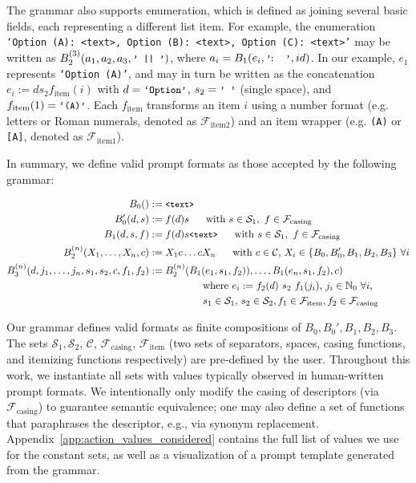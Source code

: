 \documentclass{article} %
\newcommand{\prompt}[1]{{\small{\texttt{#1}}}}
\begin{document}
The grammar also supports enumeration, which is defined as joining several basic fields, each representing a different list item. For example, the enumeration \prompt{`Option (A): <text>, Option (B): <text>, Option (C): <text>'} may be written as $B_2^{(3)}(a_1, a_2, a_3, \text{\prompt{'\ ||\ '}})$, where $a_i = B_1(e_i, \text{\prompt{'\!:\ \ '}}, id)$. In our example, $e_1$ represents \prompt{`Option (A)'}, and may in turn be written as the concatenation $e_i:=ds_2f_\text{item}(i)$ with $d=\text{\prompt{`Option'}}$, $s_2=\text{\prompt{'\ '}}$ (single space), and $f_\text{item}(1)=\text{\prompt{`(A)'}}$. Each $f_\text{item}$ transforms an item $i$ using a number format (e.g. letters or Roman numerals, denoted as $\mathcal{F}_{\text{item2}}$) and an item wrapper (e.g. \prompt{(A)} or \prompt{[A]}, denoted as $\mathcal{F}_{\text{item1}}$).

In summary, we define valid prompt formats as those accepted by the following grammar:
\begin{footnotesize}
\begin{align*}
    B_0() &:= \text{\prompt{<text>}}\\
    B_0'(d, s) &:= f(d) s \text{ \ \ \ \ with $s\in\mathcal{S}_1, \ f\in \mathcal{F}_\text{casing}$}\\
    B_1(d, s, f) &:= f(d) s \text{\prompt{<text>}} \text{ \ \ \ \ with $s\in\mathcal{S}_1, \ f\in \mathcal{F}_\text{casing}$}\\
    B_2^{(n)}(X_1, \ldots, X_n, c) &:= X_1 c\ldots c X_n \text{ \ \ \ \ with $c\in\mathcal{C}$, $X_i\in\{B_0, B_0', B_1, B_2, B_3\}\ \forall i$}\\
    B_3^{(n)}(d, j_1, \ldots, j_n, s_1, s_2, c, f_{1}, f_{2}) &:= B_2^{(n)}(B_1(e_1, s_1, f_{2})), \ldots, B_1(e_n, s_1, f_{2}), c)\\
    &\text{ \ \ \ \ \ \ \ \ \ \ \ \ \ \ \ where $e_i := f_2(d) \ s_2 \ f_{1}(j_i)$, $j_i\in\mathbb{N}_0 \ \forall i$,}\\ 
    &\text{ \ \ \ \ \ \ \ \ \ \ \ \ \ \ \ $s_1\in\mathcal{S}_1$, $s_2\in\mathcal{S}_2, f_{1}\in\mathcal{F}_\text{item},f_{2}\in\mathcal{F}_\text{casing}$}
\end{align*}
\end{footnotesize}
\vspace{-6mm}

Our grammar defines valid formats as finite compositions of $B_0, B_0', B_1, B_2, B_3$. 
The sets $\mathcal{S}_1, \mathcal{S}_2$, $\mathcal{C}$, $\mathcal{F}_\text{casing}$, $\mathcal{F}_\text{item}$ (two sets of separators, spaces, casing functions, and itemizing functions respectively) are pre-defined by the user. 
Throughout this work, we instantiate all sets with values typically observed in human-written prompt formats. 
We intentionally only modify the casing of descriptors (via $\mathcal{F}_\text{casing}$) to guarantee semantic equivalence; one may also define a set of functions that paraphrases the descriptor, e.g., via synonym replacement. 
Appendix~\ref{app:action_values_considered} contains the full list of values we use for the constant sets, 
as well as a visualization of a prompt template generated from the grammar.
\end{document}
